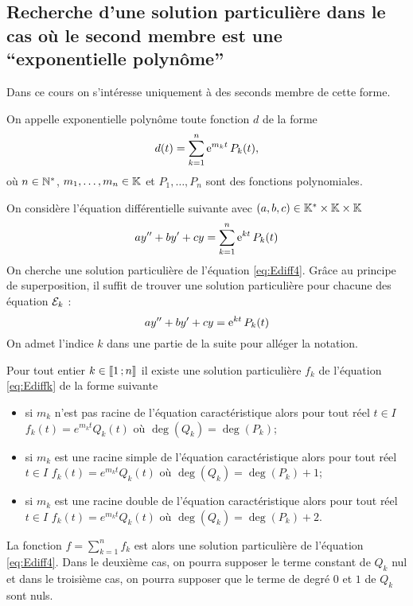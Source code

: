 \subsection{Recherche d'une solution particulière dans le cas où le second membre est une ``exponentielle polynôme''}
\label{subsec:recherchesolutionpartexppol}
Dans ce cours on s'intéresse uniquement à des seconds membre de cette forme.
\begin{defdef}
  On appelle exponentielle polynôme toute fonction \(d\) de la forme
  \begin{equation}
    d(t)=\sum_{k=1}^{n} \operatorname{e}^{m_k t} P_k (t),
  \end{equation}
où \(n \in \mathbb{N}^*\), \(m_1, \ldots, m_n \in \mathbb{K}\) et \( P_1, \ldots, P_n\) sont des fonctions polynomiales. 
\end{defdef}
On considère l'équation différentielle  suivante avec \((a,b,c) \in \mathbb{K}^{*}\times\mathbb{K}\times\mathbb{K}\)
\begin{equation}
  \label{eq:Ediff4}
  ay''+by'+cy=\sum_{k=1}^{n} \operatorname{e}^{kt} P_k(t)
\end{equation}
On cherche une solution particulière de l'équation \eqref{eq:Ediff4}. Grâce au principe de superposition, il suffit de trouver une solution particulière pour chacune des équation \(\mathcal{E}_k\) : 
\begin{equation}
  \label{eq:Ediffk}
  ay''+by'+cy= \operatorname{e}^{kt} P_k(t)
\end{equation}
On admet l'indice \(k\) dans une partie de la suite pour alléger la notation.
\begin{theo}
  Pour tout entier \(k \in \mathopen{\llbracket}1\mathclose{}\mathpunct{};n\mathclose{\rrbracket}\) il existe une solution particulière \(f_k\) de l'équation \eqref{eq:Ediffk} de la forme suivante
  \begin{itemize}
  \item si \(m_k\) n'est pas racine de l'équation caractéristique alors pour tout réel \(t \in I\) \(f_k(t)=e^{m_k t} Q_k(t)\) où \(\deg(Q_k)=\deg(P_k)\);
  \item si \(m_k\) est une racine simple de l'équation caractéristique alors pour tout réel \(t \in I\) \(f_k(t)=e^{m_k t} Q_k(t)\) où \(\deg(Q_k)=\deg(P_k)+1\);
  \item si \(m_k\) est une racine double de l'équation caractéristique alors pour tout réel \(t \in I\) \(f_k(t)=e^{m_k t} Q_k(t)\) où \(\deg(Q_k)=\deg(P_k)+2\).
  \end{itemize}
La fonction \(f=\sum_{k=1}^{n} f_k\) est alors une solution particulière de l'équation \eqref{eq:Ediff4}. Dans le deuxième cas, on pourra supposer le terme constant de \(Q_k\) nul et dans le troisième cas, on pourra supposer que le terme de degré \(0\) et \(1\) de \(Q_k\) sont nuls.
\end{theo}
